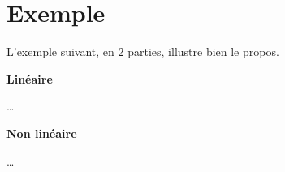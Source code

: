 \section{Exemple}

L’exemple suivant, en 2 parties, illustre bien le propos. \cite{examples}

\textbf{Linéaire}

…

\textbf{Non linéaire}

…

\pagebreak
